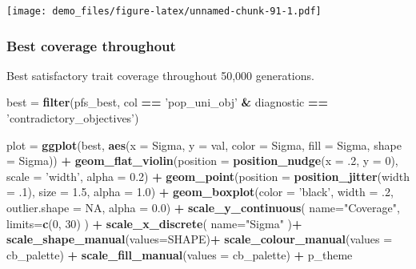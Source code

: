 \documentclass[]{book}
\newenvironment{Shaded}{\begin{snugshade}}{\end{snugshade}}
\newcommand{\DataTypeTok}[1]{\textcolor[rgb]{0.13,0.29,0.53}{#1}}
\newcommand{\DecValTok}[1]{\textcolor[rgb]{0.00,0.00,0.81}{#1}}
\newcommand{\FloatTok}[1]{\textcolor[rgb]{0.00,0.00,0.81}{#1}}
\newcommand{\KeywordTok}[1]{\textcolor[rgb]{0.13,0.29,0.53}{\textbf{#1}}}
\newcommand{\NormalTok}[1]{#1}
\newcommand{\OperatorTok}[1]{\textcolor[rgb]{0.81,0.36,0.00}{\textbf{#1}}}
\newcommand{\OtherTok}[1]{\textcolor[rgb]{0.56,0.35,0.01}{#1}}
\newcommand{\StringTok}[1]{\textcolor[rgb]{0.31,0.60,0.02}{#1}}
\begin{document}
\texttt{[image: demo\_files/figure-latex/unnamed-chunk-91-1.pdf]}

\hypertarget{best-coverage-throughout-5}{%
\subsubsection{Best coverage throughout}\label{best-coverage-throughout-5}}

Best satisfactory trait coverage throughout 50,000 generations.

\begin{Shaded}
\begin{Highlighting}[]
\NormalTok{best =}\StringTok{ }\KeywordTok{filter}\NormalTok{(pfs_best, col }\OperatorTok{==}\StringTok{ 'pop_uni_obj'} \OperatorTok{&}\StringTok{ }\NormalTok{diagnostic }\OperatorTok{==}\StringTok{ 'contradictory_objectives'}\NormalTok{)}

\NormalTok{plot =}\StringTok{ }\KeywordTok{ggplot}\NormalTok{(best, }\KeywordTok{aes}\NormalTok{(}\DataTypeTok{x =}\NormalTok{ Sigma, }\DataTypeTok{y =}\NormalTok{ val, }\DataTypeTok{color =}\NormalTok{ Sigma, }\DataTypeTok{fill =}\NormalTok{ Sigma, }\DataTypeTok{shape =}\NormalTok{ Sigma)) }\OperatorTok{+}
\StringTok{  }\KeywordTok{geom_flat_violin}\NormalTok{(}\DataTypeTok{position =} \KeywordTok{position_nudge}\NormalTok{(}\DataTypeTok{x =} \FloatTok{.2}\NormalTok{, }\DataTypeTok{y =} \DecValTok{0}\NormalTok{), }\DataTypeTok{scale =} \StringTok{'width'}\NormalTok{, }\DataTypeTok{alpha =} \FloatTok{0.2}\NormalTok{) }\OperatorTok{+}
\StringTok{  }\KeywordTok{geom_point}\NormalTok{(}\DataTypeTok{position =} \KeywordTok{position_jitter}\NormalTok{(}\DataTypeTok{width =} \FloatTok{.1}\NormalTok{), }\DataTypeTok{size =} \FloatTok{1.5}\NormalTok{, }\DataTypeTok{alpha =} \FloatTok{1.0}\NormalTok{) }\OperatorTok{+}
\StringTok{  }\KeywordTok{geom_boxplot}\NormalTok{(}\DataTypeTok{color =} \StringTok{'black'}\NormalTok{, }\DataTypeTok{width =} \FloatTok{.2}\NormalTok{, }\DataTypeTok{outlier.shape =} \OtherTok{NA}\NormalTok{, }\DataTypeTok{alpha =} \FloatTok{0.0}\NormalTok{) }\OperatorTok{+}
\StringTok{  }\KeywordTok{scale_y_continuous}\NormalTok{(}
    \DataTypeTok{name=}\StringTok{"Coverage"}\NormalTok{,}
    \DataTypeTok{limits=}\KeywordTok{c}\NormalTok{(}\DecValTok{0}\NormalTok{, }\DecValTok{30}\NormalTok{)}
\NormalTok{  ) }\OperatorTok{+}
\StringTok{  }\KeywordTok{scale_x_discrete}\NormalTok{(}
    \DataTypeTok{name=}\StringTok{"Sigma"}
\NormalTok{  )}\OperatorTok{+}
\StringTok{  }\KeywordTok{scale_shape_manual}\NormalTok{(}\DataTypeTok{values=}\NormalTok{SHAPE)}\OperatorTok{+}
\StringTok{  }\KeywordTok{scale_colour_manual}\NormalTok{(}\DataTypeTok{values =}\NormalTok{ cb_palette) }\OperatorTok{+}
\StringTok{  }\KeywordTok{scale_fill_manual}\NormalTok{(}\DataTypeTok{values =}\NormalTok{ cb_palette) }\OperatorTok{+}
\StringTok{  }\NormalTok{p_theme}


\end{Highlighting}
\end{Shaded}
\end{document}
